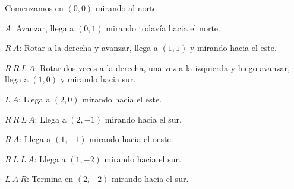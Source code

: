 \documentclass{oci}
\begin{document}
\begin{minipage}{0.45\textwidth}
\begin{itemize}
	{\footnotesize \item Comenzamos en $(0,0)$ mirando al norte
	\item $A$:  Avanzar, llega a $(0,1)$ mirando todavía hacia el norte.
	\item $R\ A$: Rotar a la derecha y avanzar, llega a $(1,1)$ y mirando hacia el este.
	\item $R\ R\ L\ A$: Rotar dos veces a la derecha, una vez a la izquierda y luego avanzar, llega a $(1,0)$ y mirando hacia sur.
	\item $L\ A$: Llega a $(2,0)$ mirando hacia el este.
	\item $R\ R\ L\ A$: Llega a $(2,-1)$ mirando hacia el sur.
	\item $R\ A$: Llega a $(1,-1)$ mirando hacia el oeste.
	\item $R\ L\ L\ A$: Llega a $(1,-2)$ mirando hacia el sur.
	\item $L\ A\ R$:  Termina en $(2,-2)$ mirando hacia el sur.}
\end{itemize}
\end{minipage}
~%
\end{document}
